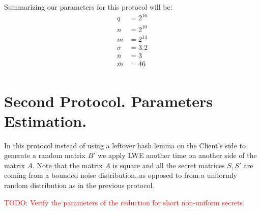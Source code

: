 \documentclass[12pt]{article}
\newcommand{\nbar}{\overline{n}}
\newcommand{\mbar}{\overline{m}}
\begin{document}
Summarizing our parameters for this protocol will be:
\begin{equation*}
   \boxed{
   \begin{aligned}
     q &= 2^{16}\\
     n &= 2^{10}\\
     m &= 2^{14}\\
     \sigma &= 3.2\\
     \nbar &= 3\\
     \mbar &= 46\\
     \end{aligned}
}
\end{equation*}

\section{Second Protocol. Parameters Estimation.}
In this protocol instead of using a leftover hash lemma on the Client's side to generate a random matrix $B'$ we apply LWE another time on another side of the matrix $A$. Note that the matrix $A$ is square and all the secret matrices $S, S'$ are coming from a bounded noise distribution, as opposed to from a uniformly random distribution as in the previous protocol.

\textcolor{red}{TODO: Verify the parameters of the reduction for short non-uniform secrets.}\\
\end{document}
